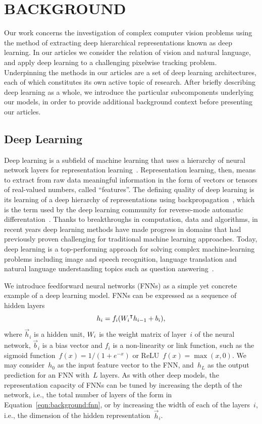 \chapter{BACKGROUND}

Our work concerns the investigation of complex computer vision problems using
the method of extracting deep hierarchical representations known as deep
learning.
In our articles we consider the relation of vision and natural language, and
apply deep learning to a challenging pixelwise tracking problem.
Underpinning the methods in our articles are a set of deep learning
architectures, each of which constitutes its own active topic of research.
After briefly describing deep learning as a whole, we introduce the particular
subcomponents underlying our models, in order to provide additional background
context before presenting our articles.


\section{Deep Learning}

Deep learning is a subfield of machine learning that uses a hierarchy of neural
network layers for representation learning~\cite{lecun2015deeplearning}.
Representation learning, then, means to extract from raw data meaningful
information in the form of vectors or tensors of real-valued numbers, called
``features''.
The defining quality of deep learning is its learning of a deep hierarchy of
representations using backpropagation~\cite{rumelhart1988learningreps}, which
is the term used by the deep learning community for reverse-mode automatic
differentation~\cite{griewank2008evaluatingderivatives}.
Thanks to breakthroughs in computation, data and algorithms, in recent years
deep learning methods have made progress in domains that had previously proven
challenging for traditional machine learning approaches.
Today, deep learning is a top-performing approach for solving complex
machine-learning problems including image and speech recognition, language
translation and natural language understanding topics such as question
answering~\cite{lecun2015deeplearning}.

We introduce feedforward neural networks (FNNs) as a simple yet concrete
example of a deep learning model.
FNNs can be expressed as a sequence of hidden layers
\begin{equation}
h_i = f_i({W_i}^\intercal h_{i - 1} + b_i),
\label{eqn:background:fnn}
\end{equation}
where $\vec{h}_i$ is a hidden unit, $W_i$ is the weight matrix of
layer~$i$ of the neural network, $\vec{b}_i$ is a bias vector and $f_i$ is a
non-linearity or link function, such as the sigmoid
function~$f(x) = 1/(1 + e^{-x})$ or ReLU~$f(x) = \max(x, 0)$.
We may consider~$h_0$ as the input feature vector to the FNN, and~$h_L$ as the
output prediction for an FNN with~$L$ layers.
As with other deep models, the representation capacity of FNNs can be tuned by
increasing the depth of the network, i.e., the total number of layers of the
form in Equation~\ref{eqn:background:fnn}, or by increasing the width of each
of the layers~$i$, i.e., the dimension of the hidden
representation~$\vec{h}_i$.

